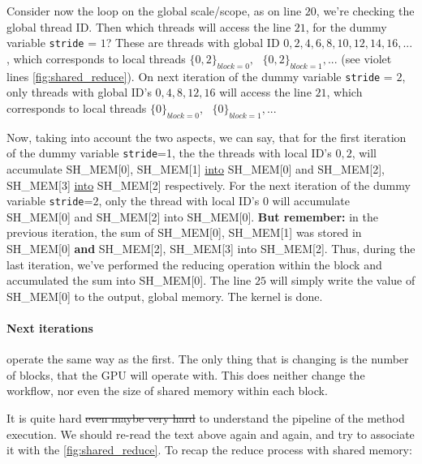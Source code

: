 Consider now the loop on the global scale/scope, as on line $20$, 
we're checking the global thread ID. Then which threads will access the line $21$, for the dummy variable \verb|stride| = $1$? 
These are threads with global ID $0,2,4,6,8,10,12,14,16, ... $, which corresponds to local threads
$\{0,2\}_{block=0},\text{ }\{0,2\}_{block=1}, ...$ (see violet lines \autoref{fig:shared_reduce}). 
On next iteration of the dummy variable \verb|stride| = $2$, only threads with global 
ID's $0,4,8,12,16$ will access the line $21$, which corresponds to local threads $\{0\}_{block=0},\text{ }\{0\}_{block=1}, ...$

Now, taking into account the two aspects, we can say, that for the first iteration of the dummy variable \verb|stride|=1, the 
the threads with local ID's $0,2$, will accumulate SH\_MEM[0], SH\_MEM[1] \underline{into} 
SH\_MEM[0] and SH\_MEM[2], SH\_MEM[3] \underline{into} SH\_MEM[2] respectively. 
For the next iteration of the dummy variable \verb|stride|=$2$, only the thread with local ID's $0$ 
will accumulate SH\_MEM[0] and SH\_MEM[2] into SH\_MEM[0]. \textbf{But remember: } in the previous iteration, 
the sum of SH\_MEM[0], SH\_MEM[1] was stored in SH\_MEM[0] \textbf{and} SH\_MEM[2], SH\_MEM[3] into SH\_MEM[2]. 
Thus, during the last iteration, we've performed the reducing operation within the block and accumulated the sum into SH\_MEM[0]. 
The line $25$ will simply write the value of SH\_MEM[0] to the output, global memory.  The kernel is done. 

\paragraph*{Next iterations} operate the same way as the first. The only thing that is changing is the number 
of blocks, that the GPU will operate with. This does neither change the workflow, nor even the size of 
shared memory within each block. 

It is quite hard \sout{even maybe very hard} to understand the pipeline of the method execution. 
We should re-read the text above again and again, and try to associate it with the \autoref{fig:shared_reduce}.
To recap the reduce process with shared memory:  

